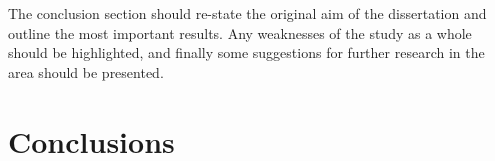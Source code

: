 The conclusion section should re-state the original aim of the dissertation and outline the most important results. Any weaknesses of the study as a whole should be highlighted, and finally some suggestions for further research in the area should be presented.


\chapter{Conclusions}